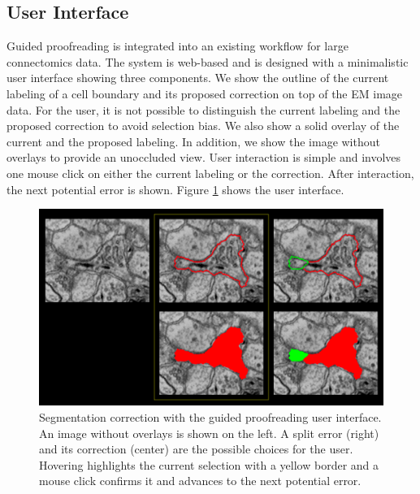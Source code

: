 \subsection{User Interface}

Guided proofreading is integrated into an existing workflow for large connectomics data. The system is web-based and is designed with a minimalistic user interface showing three components. We show the outline of the current labeling of a cell boundary and its proposed correction on top of the EM image data. For the user, it is not possible to distinguish the current labeling and the proposed correction to avoid selection bias. We also show a solid overlay of the current and the proposed labeling. In addition, we show the image without overlays to provide an unoccluded view. User interaction is simple and involves one mouse click on either the current labeling or the correction. After interaction, the next potential error is shown. Figure \ref{fig:ui} shows the user interface.

\begin{figure}[h]
\begin{center}
  \includegraphics[width=\linewidth]{gfx/user_interface_split.pdf}
\end{center}
  \vspace{-4mm}
   \caption{Segmentation correction with the guided proofreading user interface. An image without overlays is shown on the left. A split error (right) and its correction (center) are the possible choices for the user. Hovering highlights the current selection with a yellow border and a mouse click confirms it and advances to the next potential error.}
\label{fig:ui}
\end{figure}

